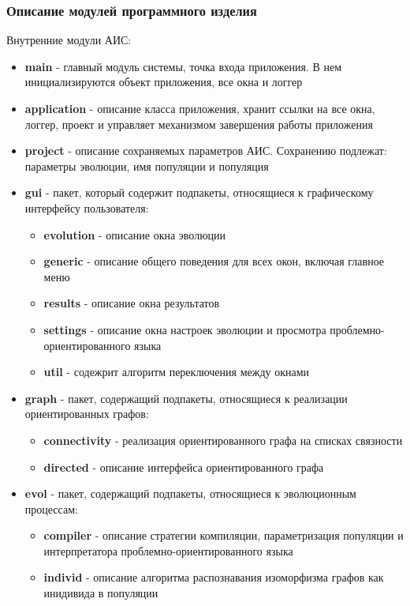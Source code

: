 \documentclass[russian,utf8,emptystyle]{eskdtext}
\begin{document}
\subsubsection{Описание модулей программного изделия}
Внутренние модули АИС:
\begin{itemize}
\item \textbf{main} - главный модуль системы, точка входа приложения. В нем инициализируются объект приложения, все окна и логгер
\item \textbf{application} - описание класса приложения, хранит ссылки на все окна, логгер, проект и управляет механизмом завершения работы приложения
\item \textbf{project} - описание сохраняемых параметров АИС. Сохранению подлежат: параметры эволюции, имя популяции и популяция
\item \textbf{gui} - пакет, который содержит подпакеты, относящиеся к графическому интерфейсу пользователя:
\begin{itemize}
\item \textbf{evolution} - описание окна эволюции
\item \textbf{generic} - описание общего поведения для всех окон, включая главное меню
\item \textbf{results} - описание окна результатов
\item \textbf{settings} - описание окна настроек эволюции и просмотра проблемно-ориентированного языка
\item \textbf{util} - содежрит алгоритм переключения между окнами
\end{itemize}
\item \textbf{graph} - пакет, содержащий подпакеты, относящиеся к реализации ориентированных графов:
\begin{itemize}
\item \textbf{connectivity} - реализация ориентированного графа на списках связности
\item \textbf{directed} - описание интерфейса ориентированного графа
\end{itemize}
\item \textbf{evol} - пакет, содержащий подпакеты, относящиеся к эволюционным процессам:
\begin{itemize}
\item \textbf{compiler} - описание стратегии компиляции, параметризация популяции и интерпретатора проблемно-ориентированного языка
\item \textbf{individ} - описание алгоритма распознавания изоморфизма графов как инидивида в популяции

\end{itemize}
\end{itemize}
\end{document}
